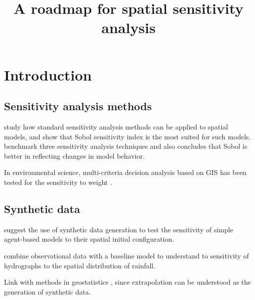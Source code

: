 


\title{A roadmap for spatial sensitivity analysis}
\author{}
\date{}


\maketitle

\justify


\begin{abstract}

\end{abstract}





\section{Introduction}


\subsection{Sensitivity analysis methods}

\cite{lilburne2009sensitivity} study how standard sensitivity analysis methods can be applied to spatial models, and show that Sobol sensitivity index is the most suited for such models. \cite{saint2010comparison} benchmark three sensitivity analysis techniques and also concludes that Sobol is better in reflecting changes in model behavior.

In environmental science, multi-criteria decision analysis based on GIS has been tested for the sensitivity to weight \cite{chen2010spatial}.



\subsection{Synthetic data}

\cite{cottineau2017initial} suggest the use of synthetic data generation to test the sensitivity of simple agent-based models to their spatial initial configuration.

\cite{obled1994sensitivity} combine observational data with a baseline model to understand to sensitivity of hydrographs to the spatial distribution of rainfall.

Link with methods in geostatistics \cite{gotway2002combining}, since extrapolation can be understood as the generation of synthetic data.


